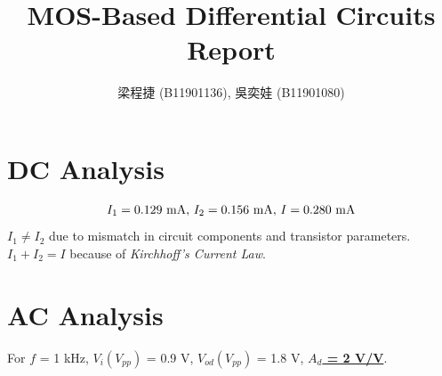 \documentclass{article}
\title{MOS-Based Differential Circuits Report}
\author{梁程捷 (B11901136), 吳奕娃 (B11901080)}
\date{}
\begin{document}
\begin{CJK*}{UTF8}{bkai}
\maketitle
\section{DC Analysis}
\begin{equation*}
    I_1 = 0.129 \text{ \unit{\milli\ampere}}, \, I_2 = 0.156 \text{ \unit{\milli\ampere}}, \, I = 0.280 \text{ \unit{\milli\ampere}}
\end{equation*}
\textbf{$I_1 \ne I_2$} due to mismatch in circuit components and transistor parameters.\\
\textbf{$I_1 + I_2 = I$} because of \textit{Kirchhoff's Current Law}.\\

\section{AC Analysis}

For $f$ = 1 \unit{\kilo\hertz}, $V_i(V_{pp})$ = 0.9 \unit{\volt}, $V_{od}(V_{pp})$ = 1.8 \unit{\volt}, \underline{\textbf{$A_d$ = 2 \unit{\volt}/\unit{\volt}}}. \\


\end{CJK*}
\end{document}
